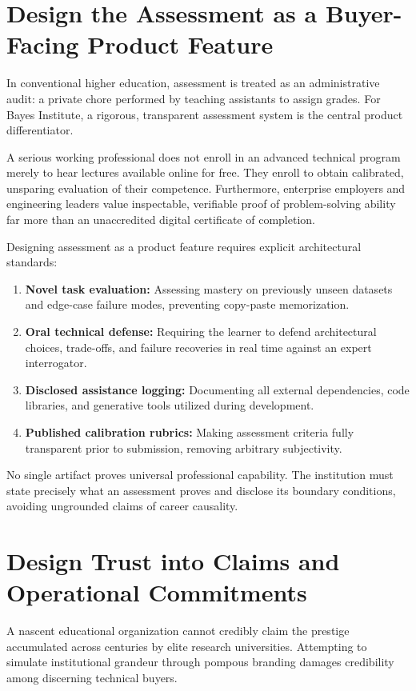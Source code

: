 \section{Design the Assessment as a Buyer-Facing Product Feature}

In conventional higher education, assessment is treated as an administrative audit: a private chore performed by teaching assistants to assign grades. For Bayes Institute, a rigorous, transparent assessment system is the central product differentiator.

A serious working professional does not enroll in an advanced technical program merely to hear lectures available online for free. They enroll to obtain calibrated, unsparing evaluation of their competence. Furthermore, enterprise employers and engineering leaders value inspectable, verifiable proof of problem-solving ability far more than an unaccredited digital certificate of completion.

Designing assessment as a product feature requires explicit architectural standards:
\begin{enumerate}[leftmargin=*]
\item \textbf{Novel task evaluation:} Assessing mastery on previously unseen datasets and edge-case failure modes, preventing copy-paste memorization.
\item \textbf{Oral technical defense:} Requiring the learner to defend architectural choices, trade-offs, and failure recoveries in real time against an expert interrogator.
\item \textbf{Disclosed assistance logging:} Documenting all external dependencies, code libraries, and generative tools utilized during development.
\item \textbf{Published calibration rubrics:} Making assessment criteria fully transparent prior to submission, removing arbitrary subjectivity.
\end{enumerate}

No single artifact proves universal professional capability. The institution must state precisely what an assessment proves and disclose its boundary conditions, avoiding ungrounded claims of career causality.

\section{Design Trust into Claims and Operational Commitments}

A nascent educational organization cannot credibly claim the prestige accumulated across centuries by elite research universities. Attempting to simulate institutional grandeur through pompous branding damages credibility among discerning technical buyers.

